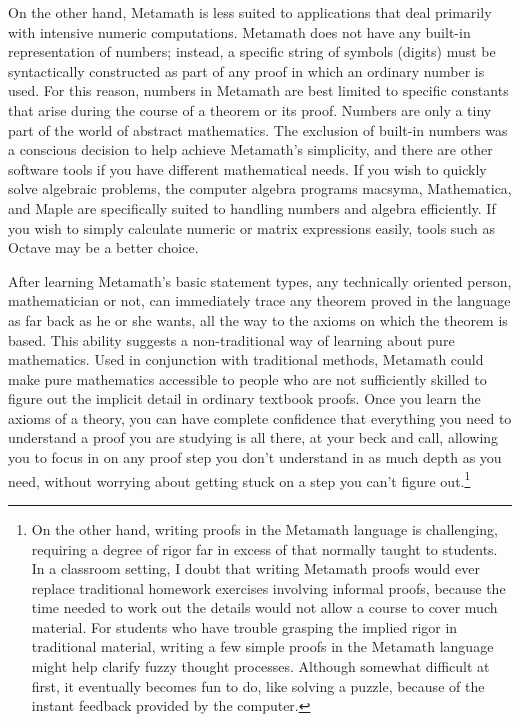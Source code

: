 On the other hand, Metamath is less suited to applications
that deal primarily with intensive numeric computations.  Metamath does not
have any built-in representation of numbers; instead, a specific string of symbols (digits) must be syntactically
constructed as part of any proof in which an ordinary number is used.  For
this reason, numbers in Metamath are best limited to specific constants that
arise during the course of a theorem or its proof.  Numbers are only a tiny
part of the world of abstract mathematics.  The exclusion of built-in numbers
was a conscious decision to help achieve Metamath's simplicity, and there are
other software tools if you have different mathematical needs.
If you wish to quickly solve algebraic problems, the computer algebra
programs {\sc
macsyma}, Mathematica, and
Maple are specifically suited to handling numbers and
algebra efficiently.
If you wish to simply calculate numeric or matrix expressions easily,
tools such as Octave may be a better choice.

After learning Metamath's basic statement types, any
tech\-ni\-cal\-ly ori\-ent\-ed person, mathematician or not, can
immediately trace
any theorem proved in the language as far back as he or she wants, all the way
to the axioms on which the theorem is based.  This ability suggests a
non-traditional way of learning about pure mathematics.  Used in conjunction
with traditional methods, Metamath could make pure mathematics accessible to
people who are not sufficiently skilled to figure out the implicit detail in
ordinary textbook proofs.  Once you learn the axioms of a theory, you can have
complete confidence that everything you need to understand a proof you are
studying is all there, at your beck and call, allowing you to focus in on any
proof step you don't understand in as much depth as you need, without worrying
about getting stuck on a step you can't figure out.\footnote{On the other
hand, writing proofs in the Metamath language is challenging, requiring
a degree of rigor far in excess of that normally taught to students.  In a
classroom setting, I doubt that writing Metamath proofs would ever replace
traditional homework exercises involving informal proofs, because the time
needed to work out the details would not allow a course to
cover much material.  For students who have trouble grasping the implied rigor
in traditional material, writing a few simple proofs in the Metamath language
might help clarify fuzzy thought processes.  Although somewhat difficult at
first, it eventually becomes fun to do, like solving a puzzle, because of the
instant feedback provided by the computer.}

